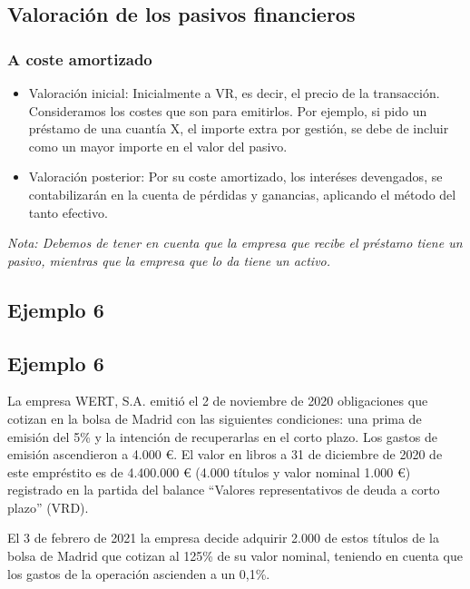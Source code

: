 \subsection{Valoración de los pasivos financieros}

\subsubsection{A coste amortizado}
\begin{itemize}
    \item Valoración inicial: Inicialmente a VR, es decir, el precio de la transacción. Consideramos los costes que son para emitirlos. Por ejemplo, si pido un préstamo de una cuantía X, el importe extra por gestión, se debe de incluir como un mayor importe en el valor del pasivo.
    \item Valoración posterior: Por su coste amortizado, los interéses devengados, se contabilizarán en la cuenta de pérdidas y ganancias, aplicando el método del tanto efectivo.
\end{itemize}

\textit{Nota: Debemos de tener en cuenta que la empresa que recibe el préstamo tiene un pasivo, mientras que la empresa que lo da tiene un activo.}







\subsection*{Ejemplo 6}

\subsection{Ejemplo 6}

La empresa WERT, S.A. emitió el 2 de noviembre de 2020 obligaciones que cotizan en la bolsa de Madrid con las siguientes condiciones: una prima de emisión del 5\% y la intención de recuperarlas en el corto plazo. Los gastos de emisión ascendieron a 4.000 €. El valor en libros a 31 de diciembre de 2020 de este empréstito es de 4.400.000 € (4.000 títulos y valor nominal 1.000 €) registrado en la partida del balance “Valores representativos de deuda a corto plazo” (VRD).

El 3 de febrero de 2021 la empresa decide adquirir 2.000 de estos títulos de la bolsa de Madrid que cotizan al 125\% de su valor nominal, teniendo en cuenta que los gastos de la operación ascienden a un 0,1\%.

